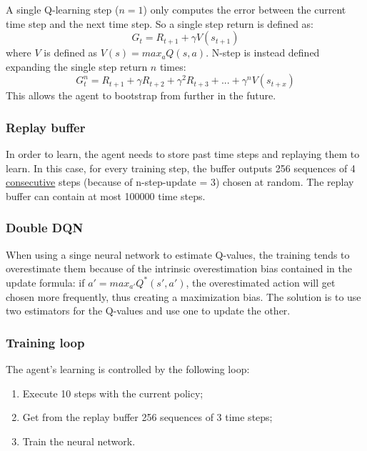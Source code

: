 \documentclass{article}
\begin{document}
A single Q-learning step ($n=1$) only computes the error between the current time step and the next time step.
So a single step return is defined as:
\begin{equation}
    G_t=R_{t+1}+\gamma V(s_{t+1})
\end{equation}
where $V$ is defined as $V(s)=max_aQ(s, a)$.
N-step is instead defined expanding the single step return $n$ times:
\begin{equation}
    G_t^n=R_{t+1}+\gamma R_{t+2}+\gamma^2R_{t+3}+...+\gamma^nV(s_{t+x})
\end{equation}
This allows the agent to bootstrap from further in the future.

\subsubsection{Replay buffer}

In order to learn, the agent needs to store past time steps and replaying them to learn.
In this case, for every training step, the buffer outputs 256 sequences of 4 \underline{consecutive} steps (because of n-step-update = 3) chosen at random.
The replay buffer can contain at most 100000 time steps.

\subsubsection{Double DQN}

When using a singe neural network to estimate Q-values, the training tends to overestimate them because of the intrinsic overestimation bias contained in the update formula: if $a'=max_{a'}Q^*(s',a')$, the overestimated action will get chosen more frequently, thus creating a maximization bias.
The solution is to use two estimators for the Q-values and use one to update the other\cite{doubleDQNpaper}.

\subsubsection{Training loop}

The agent's learning is controlled by the following loop:
\begin{enumerate}
    \item Execute 10 steps with the current policy;
    \item Get from the replay buffer 256 sequences of 3 time steps;
    \item Train the neural network.
\end{enumerate}
\end{document}
